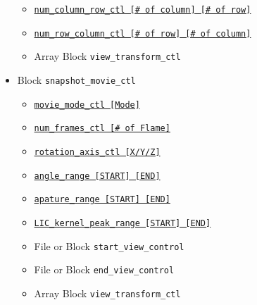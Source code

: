 \begin{itemize}
			\label{href_i:quilt_image_ctl}
	\begin{itemize}
		\item \hyperref[href_t:num_column_row_ctl]
				{\tt num\_column\_row\_ctl     [\# of column] [\# of row]}
		\item \hyperref[href_t:num_row_column_ctl]
				{\tt num\_row\_column\_ctl     [\# of row] [\# of column]}
	    \item Array Block \verb|view_transform_ctl|
				\label{href_i:quilt_view_transform_ctl}
	\end{itemize}
%
    \item Block        \verb|snapshot_movie_ctl|
			\label{href_i:snapshot_movie_ctl}
	\begin{itemize}
		\item \hyperref[href_t:movie_mode_ctl]
				{\tt movie\_mode\_ctl       [Mode]}
		\item \hyperref[href_t:num_frames_ctl]
				{\tt num\_frames\_ctl       [\# of Flame]}
		\item \hyperref[href_t:rotation_axis_ctl]
				{\tt rotation\_axis\_ctl    [X/Y/Z]}
		\item \hyperref[href_t:angle_range]
				{\tt angle\_range    [START] [END]}
		\item \hyperref[href_t:apature_range]
				{\tt apature\_range  [START] [END]}
		\item \hyperref[href_t:LIC_kernel_peak_range]
				{\tt LIC\_kernel\_peak\_range  [START] [END]}
%
	    \item File or Block \verb|start_view_control|
				\label{href_i:start_view_control}
	    \item File or Block \verb|end_view_control|
				\label{href_i:end_view_control}
	    \item Array Block \verb|view_transform_ctl|
				\label{href_i:movie_view_transform_ctl}
	\end{itemize}
\end{itemize}
